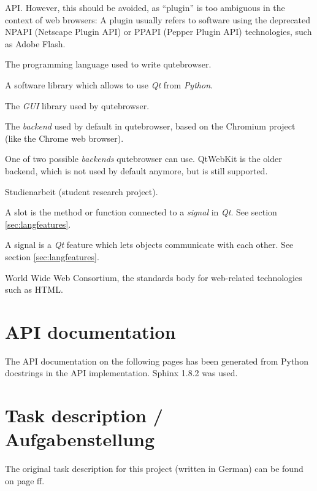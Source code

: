 \begin{appendices}
\begin{multicols}{2}
\begin{description}[leftmargin=0pt]
{      API. However, this should be avoided, as ``plugin'' is too ambiguous in
      the context of web browsers: A plugin usually refers to software using the
      deprecated NPAPI (Netscape Plugin API) or PPAPI (Pepper Plugin API)
      technologies, such as Adobe Flash.}
  \item[Python]{The programming language used to write qutebrowser.}
  \item[PyQt]{A software library which allows to use \emph{Qt} from \emph{Python}.}
  \item[Qt]{The \emph{GUI} library used by qutebrowser.}
  \item[QtWebEngine]{The \emph{backend} used by default in qutebrowser, based on
      the Chromium project (like the Chrome web browser).}
  \item[QtWebKit]{One of two possible \emph{backends} qutebrowser can use.
      QtWebKit is the older backend, which is not used by default anymore, but is
      still supported.}
  \item[SA]{Studienarbeit (student research project).}
  \item[slot] A slot is the method or function connected to a \emph{signal} in
    \emph{Qt}. See section \ref{sec:langfeatures}.
  \item[signal] A signal is a \emph{Qt} feature which lets objects communicate
    with each other. See section \ref{sec:langfeatures}.
  \item[W3C]{World Wide Web Consortium, the standards body for web-related
      technologies such as HTML.}
\end{description}
\end{multicols}

\chapter{API documentation}
\label{ch:sphinx}
The API documentation on the following pages has been generated from Python
docstrings in the API implementation. Sphinx 1.8.2 was used.

{\let\clearpage\relax\chapter{Task description / Aufgabenstellung}}
The original task description for this project (written in German) can be found on page \pageref{ch:aufgabenstellung}ff.


\label{ch:aufgabenstellung}



\end{appendices}
